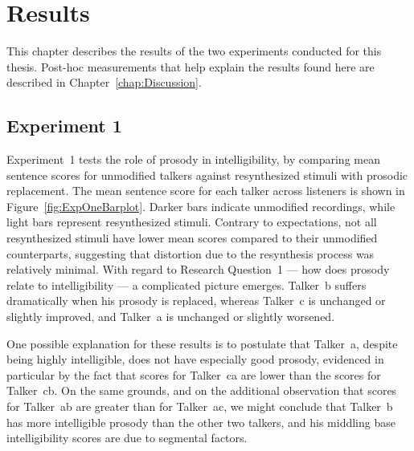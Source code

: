\chapter{Results\label{chap:Results}}

This chapter describes the results of the two experiments conducted for this thesis.  Post-hoc measurements that help explain the results found here are described in Chapter~\ref{chap:Discussion}. 

\section{Experiment 1}
Experiment~1 tests the role of prosody in intelligibility, by comparing mean sentence scores for unmodified talkers against resynthesized stimuli with prosodic replacement.  The mean sentence score for each talker across listeners is shown in Figure~\ref{fig:ExpOneBarplot}.  Darker bars indicate unmodified recordings, while light bars represent resynthesized stimuli.  Contrary to expectations, not all resynthesized stimuli have lower mean scores compared to their unmodified counterparts, suggesting that distortion due to the resynthesis process was relatively minimal.\footnotemark{}  With regard to Research Question~1 — how does prosody relate to intelligibility — a complicated picture emerges.  Talker~\ac{b} suffers dramatically when his prosody is replaced, whereas Talker~\ac{c} is unchanged or slightly improved, and Talker~\ac{a} is unchanged or slightly worsened.


One possible explanation for these results is to postulate that Talker~\ac{a}, despite being highly intelligible, does not have especially good prosody, evidenced in particular by the fact that scores for Talker~\ac{ca} are lower than the scores for Talker~\ac{cb}.  On the same grounds, and on the additional observation that scores for Talker~\ac{ab} are greater than for Talker~\ac{ac}, we might conclude that Talker~\ac{b} has more intelligible prosody than the other two talkers, and his middling base intelligibility scores are due to segmental factors.

